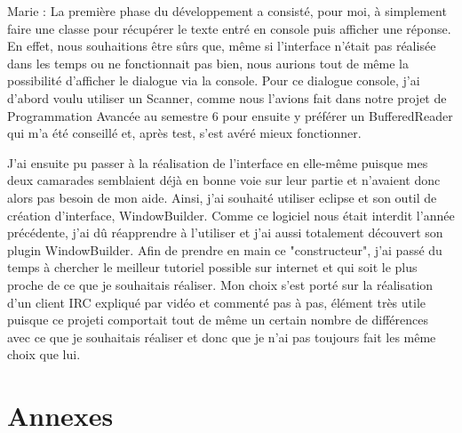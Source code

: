 \documentclass[a4paper,12pt]{article}
\begin{document}
Marie :
La première phase du développement a consisté, pour moi, à simplement faire une classe pour récupérer le texte entré en console puis afficher une réponse. En effet, nous souhaitions être sûrs que, même si l'interface n'était pas réalisée dans les temps ou ne fonctionnait pas bien, nous aurions tout de même la possibilité d'afficher le dialogue via la console. 
Pour ce dialogue console, j'ai d'abord voulu utiliser un Scanner, comme nous l'avions fait dans notre projet de Programmation Avancée au semestre 6 pour ensuite y préférer un BufferedReader qui m'a été conseillé et, après test, s'est avéré mieux fonctionner.

J'ai ensuite pu passer à la réalisation de l'interface en elle-même puisque mes deux camarades semblaient  déjà en bonne voie sur leur partie et n'avaient donc alors pas besoin de mon aide. 
Ainsi, j'ai souhaité utiliser eclipse et son outil de création d'interface, WindowBuilder. Comme ce logiciel nous était interdit l'année précédente, j'ai dû réapprendre à l'utiliser et j'ai aussi totalement découvert son plugin WindowBuilder. Afin de prendre en main ce "constructeur", j'ai passé du temps à chercher le meilleur tutoriel possible sur internet et qui soit le plus proche de ce que je souhaitais réaliser. Mon choix s'est porté sur la réalisation d'un client IRC expliqué par vidéo et commenté pas à pas, élément très utile puisque ce projeti comportait tout de même un certain nombre de différences avec ce que je souhaitais réaliser et donc que je n'ai pas toujours fait les même choix que lui. 
\section{Annexes}
\end{document}
